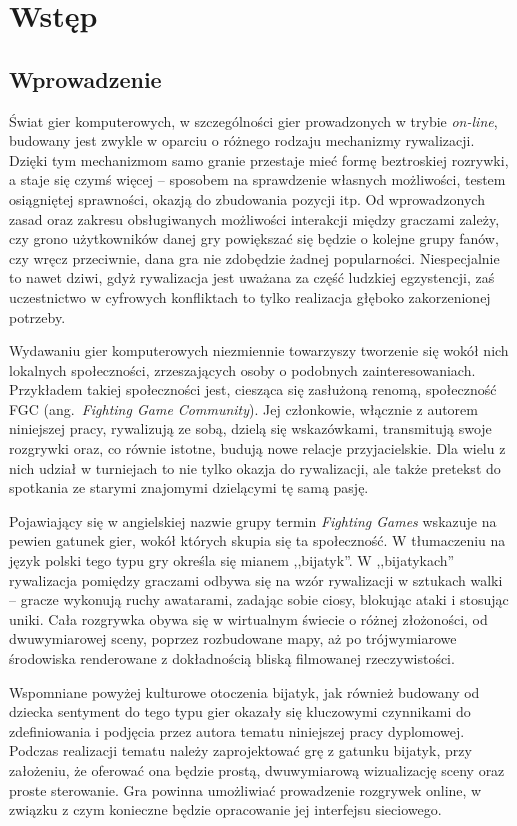 \chapter{Wstęp}
\section{Wprowadzenie}
Świat gier komputerowych, w szczególności gier prowadzonych w trybie \emph{on-line}, budowany jest zwykle w oparciu o różnego rodzaju mechanizmy rywalizacji. Dzięki tym mechanizmom samo granie przestaje mieć formę beztroskiej rozrywki, a staje się czymś więcej -- sposobem na sprawdzenie własnych możliwości, testem osiągniętej sprawności, okazją do zbudowania pozycji itp. Od wprowadzonych zasad oraz zakresu obsługiwanych możliwości interakcji między graczami zależy, czy grono użytkowników danej gry powiększać się będzie o kolejne grupy fanów, czy wręcz przeciwnie, dana gra nie zdobędzie żadnej popularności. Niespecjalnie to nawet dziwi, gdyż rywalizacja jest uważana za część ludzkiej egzystencji, zaś uczestnictwo w cyfrowych konfliktach to tylko realizacja głęboko zakorzenionej potrzeby.

Wydawaniu gier komputerowych niezmiennie towarzyszy tworzenie się wokół nich lokalnych społeczności, zrzeszających osoby o podobnych zainteresowaniach. Przykładem takiej społeczności jest, ciesząca się zasłużoną renomą, społeczność FGC (ang.~\emph{Fighting Game Community}). Jej członkowie, włącznie z autorem niniejszej pracy, rywalizują ze sobą, dzielą się wskazówkami, transmitują swoje rozgrywki oraz, co równie istotne, budują nowe relacje przyjacielskie. Dla wielu z nich udział w turniejach to nie tylko okazja do rywalizacji, ale także pretekst do spotkania ze starymi znajomymi dzielącymi tę samą pasję.

Pojawiający się w angielskiej nazwie grupy termin \emph{Fighting Games} wskazuje na pewien gatunek gier, wokół których skupia się ta społeczność. W tłumaczeniu na język polski tego typu gry określa się mianem ,,bijatyk''. W  ,,bijatykach'' rywalizacja pomiędzy graczami odbywa się na wzór rywalizacji w sztukach walki -- gracze wykonują ruchy awatarami, zadając sobie ciosy, blokując ataki i stosując uniki. Cała rozgrywka obywa się w wirtualnym świecie o różnej złożoności, od dwuwymiarowej sceny, poprzez rozbudowane mapy, aż po trójwymiarowe środowiska renderowane z dokładnością bliską filmowanej rzeczywistości.

Wspomniane powyżej kulturowe otoczenia bijatyk, jak również budowany od dziecka sentyment do tego typu gier okazały się kluczowymi czynnikami do zdefiniowania i podjęcia przez autora tematu niniejszej pracy dyplomowej. Podczas realizacji tematu należy zaprojektować grę z gatunku bijatyk, przy założeniu, że oferować ona będzie prostą, dwuwymiarową wizualizację sceny oraz proste sterowanie. Gra powinna umożliwiać prowadzenie rozgrywek online, w związku z czym konieczne będzie opracowanie jej interfejsu sieciowego. 

